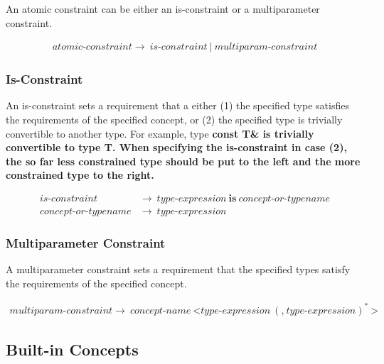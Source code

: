 \documentclass[a4paper,oneside,11pt]{article}
\begin{document}
An atomic constraint can be either an is-constraint or a multiparameter constraint.

\begin{align*}
atomic\textrm{-}constraint \rightarrow \> \hyperref[isconstraint]{is\textrm{-}constraint} \> | \>
\hyperref[multiparamconstraint]{multiparam\textrm{-}constraint}
\end{align*}

\subsubsection{Is-Constraint}\label{isconstraint}

An is-constraint sets a requirement that a either (1) the specified type satisfies the requirements of the specified concept, or (2) the specified type is trivially convertible to another type. For example, type \bf{const T\&} is trivially convertible to type \bf{T}.
When specifying the is-constraint in case (2), the so far less constrained type should be put to the left and the more constrained type to the right.

\begin{align*}
is\textrm{-}constraint &\rightarrow \> \hyperref[typeexpr]{type\textrm{-}expression} \> \textbf{is} \> concept\textrm{-}or\textrm{-}typename\\
concept\textrm{-}or\textrm{-}typename &\rightarrow \> \hyperref[typeexpr]{type\textrm{-}expression}
\end{align*}

\subsubsection{Multiparameter Constraint}\label{multiparamconstraint}

A multiparameter constraint sets a requirement that the specified types satisfy the requirements of the specified concept.

\begin{align*}
multiparam\textrm{-}constraint \rightarrow \> \hyperref[conceptname]{concept\textrm{-}name} \> \texttt{<} \hyperref[typeexpr]{type\textrm{-}expression} \>
(\texttt{,} \> \hyperref[typeexpr]{type\textrm{-}expression})^* \> \texttt{>}
\end{align*}

\subsection{Built-in Concepts}
\end{document}
